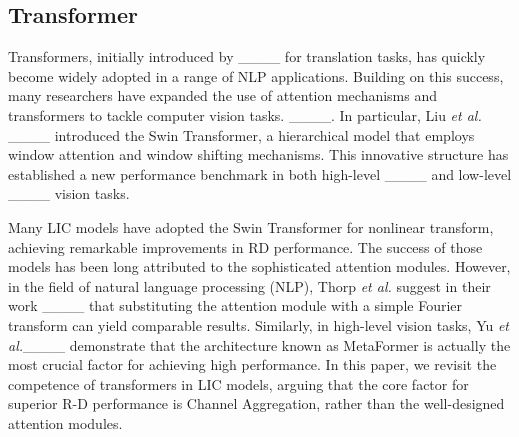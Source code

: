 \subsection{Transformer} 










Transformers, initially introduced by ____ for translation tasks, has quickly become widely adopted in a range of NLP applications. Building on this success, many researchers have expanded the use of attention mechanisms and transformers to tackle computer vision tasks. ____. 
In particular, Liu \textit{et al.} ____ introduced the Swin Transformer, a hierarchical model that employs window attention and window shifting mechanisms. This innovative structure has established a new performance benchmark in both high-level ____ and low-level  ____ vision tasks.

Many LIC models have adopted the Swin Transformer for nonlinear transform, achieving remarkable improvements in RD performance.  
The success of those models has been long attributed to the sophisticated attention modules. However, in the field of natural language processing (NLP), Thorp \textit{et al.} suggest in their work ____ that substituting the attention module with a simple Fourier transform can yield comparable results. Similarly, in high-level vision tasks, Yu \textit{et al.}____ demonstrate that the architecture known as MetaFormer is actually the most crucial factor for achieving high performance.
In this paper, we revisit the competence of transformers in LIC models, arguing that the core factor for superior R-D performance is Channel Aggregation, rather than the well-designed attention modules.
